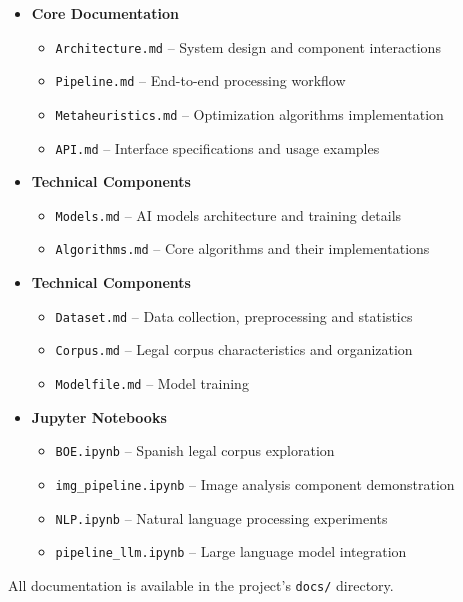 \documentclass[conference]{IEEEtran}
\begin{document}
\begin{itemize}
    \item \textbf{Core Documentation}
    \begin{itemize}
        \item \texttt{Architecture.md} -- System design and component interactions
        \item \texttt{Pipeline.md} -- End-to-end processing workflow
        \item \texttt{Metaheuristics.md} -- Optimization algorithms implementation
        \item \texttt{API.md} -- Interface specifications and usage examples
    \end{itemize}
    
    \item \textbf{Technical Components}
    \begin{itemize}
        \item \texttt{Models.md} -- AI models architecture and training details
        \item \texttt{Algorithms.md} -- Core algorithms and their implementations
    \end{itemize}
    
    \item \textbf{Technical Components}
    \begin{itemize}
        \item \texttt{Dataset.md} -- Data collection, preprocessing and statistics
        \item \texttt{Corpus.md} -- Legal corpus characteristics and organization
        \item \texttt{Modelfile.md} -- Model training
    \end{itemize}
    
    \item \textbf{Jupyter Notebooks}
    \begin{itemize}
        \item \texttt{BOE.ipynb} -- Spanish legal corpus exploration
        \item \texttt{img\_pipeline.ipynb} -- Image analysis component demonstration
        \item \texttt{NLP.ipynb} -- Natural language processing experiments
        \item \texttt{pipeline\_llm.ipynb} -- Large language model integration
    \end{itemize}
\end{itemize}

All documentation is available in the project's \texttt{docs/} directory.
\end{document}

